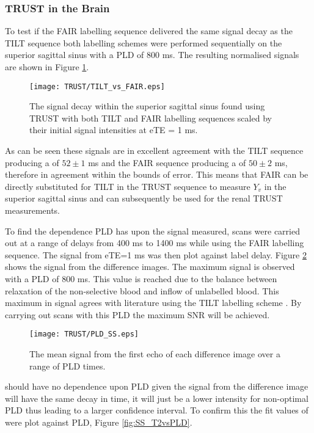 \subsubsection{\ac{TRUST} in the Brain}

To test if the \ac{FAIR} labelling sequence delivered the same signal decay as the \ac{TILT} sequence both labelling schemes were performed sequentially on the superior sagittal sinus with a \ac{PLD} of 800 ms. The resulting normalised signals are shown in Figure \ref{fig:TILT_vs_FAIR}.
\begin{figure}[H]
	\centering
	\texttt{[image: TRUST/TILT\_vs\_FAIR.eps]}
	\caption{The signal decay within the superior sagittal sinus found using \ac{TRUST} with both \ac{TILT} and \ac{FAIR} labelling sequences scaled by their initial signal intensities at eTE = 1 ms.}
	\label{fig:TILT_vs_FAIR}	
\end{figure}

As can be seen these signals are in excellent agreement with the \ac{TILT} sequence producing a \ttwo of $52\pm1$ ms and the \ac{FAIR} sequence producing a \ttwo of $50\pm2$ ms, therefore in agreement within the bounds of error. This means that \ac{FAIR} can be directly substituted for \ac{TILT} in the \ac{TRUST} sequence to measure $Y_v$ in the superior sagittal sinus and can subsequently be used for the renal \ac{TRUST} measurements.

To find the dependence \ac{PLD} has upon the signal measured, scans were carried out at a range of delays from 400 ms to 1400 ms while using the \ac{FAIR} labelling sequence. The signal from \ac{eTE}=1 ms was then plot against label delay. Figure \ref{fig:Sig_vs_PLD_SS} shows the signal from the difference images. The maximum signal is observed with a \ac{PLD} of 800 ms. This value is reached due to the balance between \tone relaxation of the non-selective blood and inflow of unlabelled blood. This maximum in signal agrees with literature using the \ac{TILT} labelling scheme \cite{lu_quantitative_2008}. By carrying out scans with this \ac{PLD} the maximum \ac{SNR} will be achieved. 

\begin{figure}[H]
	\centering
	\texttt{[image: TRUST/PLD\_SS.eps]}
	\caption{The mean signal from the first echo of each difference image over a range of \ac{PLD} times.}
	\label{fig:Sig_vs_PLD_SS}	
\end{figure}

\ttwo should have no dependence upon \ac{PLD} given the signal from the difference image will have the same decay in time, it will just be a lower intensity for non-optimal \ac{PLD} thus leading to a larger confidence interval. To confirm this the fit values of \ttwo were plot against \ac{PLD}, Figure \ref{fig:SS_T2vsPLD}.


